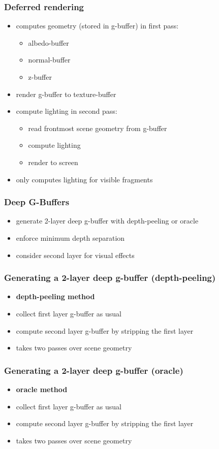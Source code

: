 \documentclass{beamer}
\begin{document}
	\begin{frame}
		\frametitle{Deferred rendering}
		\begin{itemize}
			\item computes geometry (stored in g-buffer) in first pass:
				\begin{itemize}
					\item albedo-buffer
					\item normal-buffer
					\item z-buffer
				\end{itemize}
			\item render g-buffer to texture-buffer
			\item compute lighting in second pass:
				\begin{itemize}
					\item read frontmost scene geometry from g-buffer
					\item compute lighting
					\item render to screen
				\end{itemize}
			\item only computes lighting for visible fragments
		\end{itemize}
	\end{frame}

	\begin{frame}
		\frametitle{Deep G-Buffers}
		\begin{itemize}
			\item generate 2-layer deep g-buffer with depth-peeling or oracle
			\item enforce minimum depth separation
			\item consider second layer for visual effects
		\end{itemize}
	\end{frame}	

	\begin{frame}
		\frametitle{Generating a 2-layer deep g-buffer (depth-peeling)}
		\begin{itemize}
			\item \textbf{depth-peeling method}
			\item collect first layer g-buffer as usual
			\item compute second layer g-buffer by stripping the first layer
			\item takes two passes over scene geometry
		\end{itemize}
	\end{frame}	

	\begin{frame}
		\frametitle{Generating a 2-layer deep g-buffer (oracle)}
		\begin{itemize}
			\item \textbf{oracle method}
			\item collect first layer g-buffer as usual
			\item compute second layer g-buffer by stripping the first layer
			\item takes two passes over scene geometry
		\end{itemize}
	\end{frame}	
\end{document}
